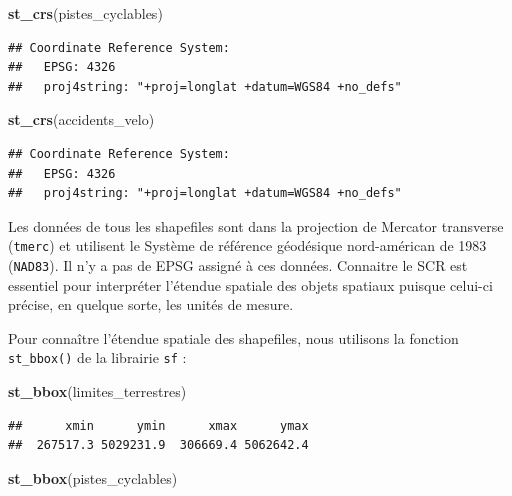 \documentclass[]{article}
\newenvironment{Shaded}{\begin{snugshade}}{\end{snugshade}}
\newcommand{\KeywordTok}[1]{\textcolor[rgb]{0.13,0.29,0.53}{\textbf{#1}}}
\newcommand{\NormalTok}[1]{#1}
\begin{document}
\begin{Shaded}
\begin{Highlighting}[]
\KeywordTok{st_crs}\NormalTok{(pistes_cyclables)}
\end{Highlighting}
\end{Shaded}

\begin{verbatim}
## Coordinate Reference System:
##   EPSG: 4326 
##   proj4string: "+proj=longlat +datum=WGS84 +no_defs"
\end{verbatim}

\begin{Shaded}
\begin{Highlighting}[]
\KeywordTok{st_crs}\NormalTok{(accidents_velo)}
\end{Highlighting}
\end{Shaded}

\begin{verbatim}
## Coordinate Reference System:
##   EPSG: 4326 
##   proj4string: "+proj=longlat +datum=WGS84 +no_defs"
\end{verbatim}

Les données de tous les shapefiles sont dans la projection de Mercator
transverse (\texttt{tmerc}) et utilisent le Système de référence
géodésique nord-américan de 1983 (\texttt{NAD83}). Il n'y a pas de EPSG
assigné à ces données. Connaitre le SCR est essentiel pour interpréter
l'étendue spatiale des objets spatiaux puisque celui-ci précise, en
quelque sorte, les unités de mesure.

Pour connaître l'étendue spatiale des shapefiles, nous utilisons la
fonction \texttt{st\_bbox()} de la librairie \texttt{sf} :

\begin{Shaded}
\begin{Highlighting}[]
\KeywordTok{st_bbox}\NormalTok{(limites_terrestres)}
\end{Highlighting}
\end{Shaded}

\begin{verbatim}
##      xmin      ymin      xmax      ymax 
##  267517.3 5029231.9  306669.4 5062642.4
\end{verbatim}

\begin{Shaded}
\begin{Highlighting}[]
\KeywordTok{st_bbox}\NormalTok{(pistes_cyclables)}
\end{Highlighting}
\end{Shaded}
\end{document}
